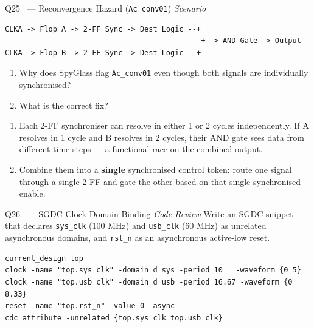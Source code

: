 \documentclass[12pt,a4paper]{article}
\newcommand{\advanced}{%
  \fbox{\textcolor{advred}{\bfseries\sffamily\small ADVANCED}}}
\newcommand{\moderate}{%
  \fbox{\textcolor{modoran}{\bfseries\sffamily\small MODERATE}}}
\begin{document}
\begin{questionbox}{Q25 \advanced\ --- Reconvergence Hazard (\texttt{Ac\_conv01}) \hfill\textit{Scenario}}

\begin{lstlisting}[style=plaincode]
CLKA -> Flop A -> 2-FF Sync -> Dest Logic --+
                                             +--> AND Gate -> Output
CLKA -> Flop B -> 2-FF Sync -> Dest Logic --+
\end{lstlisting}

\begin{enumerate}[label=\textbf{\alph*)}]
  \item Why does SpyGlass flag \texttt{Ac\_conv01} even though both signals are individually synchronised?
  \item What is the correct fix?
\end{enumerate}
\end{questionbox}

\begin{answerbox}
\begin{enumerate}[label=\textbf{\alph*)}]
  \item Each 2-FF synchroniser can resolve in either 1 or 2 cycles independently. If A resolves in 1 cycle and B resolves in 2 cycles, their AND gate sees data from different time-steps --- a functional race on the combined output.
  \item Combine them into a \textbf{single} synchronised control token: route one signal through a single 2-FF and gate the other based on that single synchronised enable.
\end{enumerate}
\end{answerbox}

\begin{questionbox}{Q26 \moderate\ --- SGDC Clock Domain Binding \hfill\textit{Code Review}}
Write an SGDC snippet that declares \texttt{sys\_clk} (100 MHz) and \texttt{usb\_clk} (60 MHz) as unrelated asynchronous domains, and \texttt{rst\_n} as an asynchronous active-low reset.
\end{questionbox}

\begin{answerbox}
\begin{lstlisting}[style=tclstyle]
current_design top
clock -name "top.sys_clk" -domain d_sys -period 10   -waveform {0 5}
clock -name "top.usb_clk" -domain d_usb -period 16.67 -waveform {0 8.33}
reset -name "top.rst_n" -value 0 -async
cdc_attribute -unrelated {top.sys_clk top.usb_clk}
\end{lstlisting}
\end{answerbox}
\end{document}
